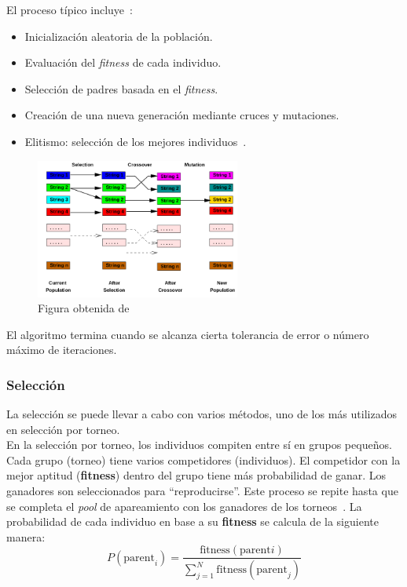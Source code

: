 El proceso típico incluye~\cite{mathew2012genetic}:
\begin{itemize}
    \item Inicialización aleatoria de la población.
    \item Evaluación del \textit{fitness} de cada individuo.
    \item Selección de padres basada en el \textit{fitness}.
    \item Creación de una nueva generación mediante cruces y mutaciones.
    \item Elitismo: selección de los mejores individuos~\cite{mirjalili2019genetic}.
\end{itemize}

\begin{figure}[H]
    \begin{center}
        \includegraphics[width=0.6\textwidth]{imagenes/ga-working-principle.png}
    \end{center}
    \caption[Funcionamiento de un algoritmo genético]{Figura obtenida de \cite{mathew2012genetic}}
\end{figure}


El algoritmo termina cuando se alcanza cierta tolerancia de error o número máximo de iteraciones.

\subsubsection{Selección}
La selección se puede llevar a cabo con varios métodos, uno de los más utilizados en selección por torneo.\\[6pt]
En la selección por torneo, los individuos compiten entre sí en grupos pequeños. Cada grupo (torneo) tiene varios competidores (individuos). El competidor con la mejor aptitud (\textbf{fitness}) dentro del grupo tiene más probabilidad de ganar. Los ganadores son seleccionados para ``reproducirse''. Este proceso se repite hasta que se completa el \textit{pool} de apareamiento con los ganadores de los torneos~\cite{miller_genetic_nodate}. La probabilidad de cada individuo en base a su \textbf{fitness} se calcula de la siguiente manera:
\begin{equation}
    P(\text{parent}_i) = \frac{\text{fitness}(\text{parent}i)}{\sum_{j=1}^{N} \text{fitness}(\text{parent}_j)}
\end{equation}

